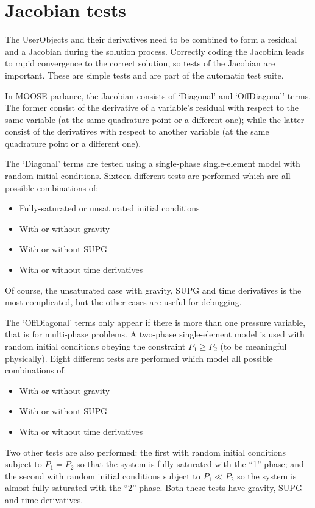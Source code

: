 \documentclass[]{scrreprt}
\begin{document}
\chapter{Jacobian tests}
\label{jac}

The UserObjects and their derivatives need to be combined to form a
residual and a Jacobian during the solution process.  Correctly coding
the Jacobian leads to rapid convergence to the correct solution, so
tests of the Jacobian are important.  These are simple tests and are
part of the automatic test suite.

In MOOSE parlance, the Jacobian consists of `Diagonal' and
`OffDiagonal' terms.  The former consist of the derivative of a
variable's residual with respect to the same variable (at the same
quadrature point or a different one); while the latter
consist of the derivatives with respect to another variable (at the
same quadrature point or a different one).

The `Diagonal' terms are tested using a single-phase single-element
model with random initial conditions.  Sixteen different tests are
performed which are all possible combinations of:
\begin{itemize}
\item Fully-saturated or unsaturated initial conditions
\item With or without gravity
\item With or without SUPG
\item With or without time derivatives
\end{itemize}
Of course, the unsaturated case with gravity, SUPG and time
derivatives is the most complicated, but the other cases are useful
for debugging.

The `OffDiagonal' terms only appear if there is more than one pressure
variable, that is for multi-phase problems.  A two-phase
single-element model is used with random initial conditions
obeying the constraint $P_{1}\geq P_{2}$ (to be meaningful physically).  Eight
different tests are performed which model all possible combinations
of:
\begin{itemize}
\item With or without gravity
\item With or without SUPG
\item With or without time derivatives
\end{itemize}
Two other tests are also performed: the first with random initial
conditions subject to $P_{1}=P_{2}$ so that the system is fully
saturated with the ``1'' phase; and the second with random initial
conditions subject to $P_{1}\ll P_{2}$ so the system is almost fully
saturated with the ``2'' phase.  Both these tests have gravity, SUPG
and time derivatives.
\end{document}
